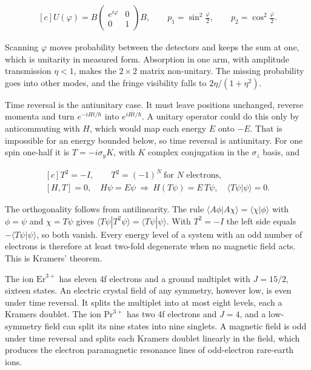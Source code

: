 \documentclass[11pt,oneside]{book}
\newenvironment{centeredalign}{\[\begin{gathered}[c]}{\end{gathered}\]}
\begin{document}
\begin{centeredalign}
U(\varphi)=B\begin{pmatrix}e^{i\varphi}&0\\0&1\end{pmatrix}B,\qquad
p_1=\sin^2\frac\varphi2,\qquad p_2=\cos^2\frac\varphi2.
\end{centeredalign}

Scanning \(\varphi\) moves probability between the detectors and keeps the sum at one, which is unitarity in measured form. Absorption in one arm, with amplitude transmission \(\eta<1\), makes the \(2\times2\) matrix non-unitary. The missing probability goes into other modes, and the fringe visibility falls to \(2\eta/(1+\eta^2)\).

Time reversal is the antiunitary case. It must leave positions unchanged, reverse momenta and turn \(e^{-iHt/\hbar}\) into \(e^{iHt/\hbar}\). A unitary operator could do this only by anticommuting with \(H\), which would map each energy \(E\) onto \(-E\). That is impossible for an energy bounded below, so time reversal is antiunitary. For one spin one-half it is \(T=-i\sigma_yK\), with \(K\) complex conjugation in the \(\sigma_z\) basis, and

\begin{centeredalign}
T^2=-I,\qquad T^2=(-1)^N\ \text{for }N\text{ electrons},\\
[H,T]=0,\quad H\psi=E\psi\ \Longrightarrow\ H(T\psi)=E\,T\psi,\quad \langle T\psi|\psi\rangle=0.
\end{centeredalign}

The orthogonality follows from antilinearity. The rule \(\langle A\phi|A\chi\rangle=\langle\chi|\phi\rangle\) with \(\phi=\psi\) and \(\chi=T\psi\) gives \(\langle T\psi|T^2\psi\rangle=\langle T\psi|\psi\rangle\). With \(T^2=-I\) the left side equals \(-\langle T\psi|\psi\rangle\), so both vanish. Every energy level of a system with an odd number of electrons is therefore at least two-fold degenerate when no magnetic field acts. This is Kramers' theorem.

The ion \(\mathrm{Er}^{3+}\) has eleven 4f electrons and a ground multiplet with \(J=15/2\), sixteen states. An electric crystal field of any symmetry, however low, is even under time reversal. It splits the multiplet into at most eight levels, each a Kramers doublet. The ion \(\mathrm{Pr}^{3+}\) has two 4f electrons and \(J=4\), and a low-symmetry field can split its nine states into nine singlets. A magnetic field is odd under time reversal and splits each Kramers doublet linearly in the field, which produces the electron paramagnetic resonance lines of odd-electron rare-earth ions.
\end{document}

